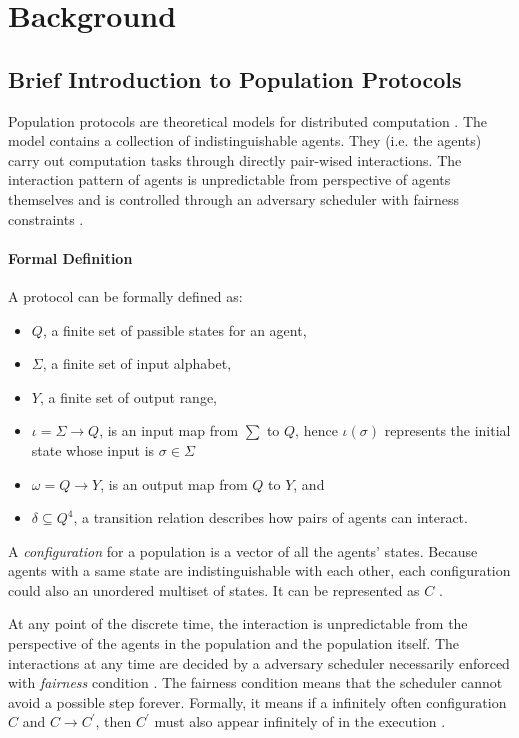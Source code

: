 \section{Background}

\subsection{Brief Introduction to Population Protocols \label{background} \cite{AspnesR2007, MCS11}}
\par\noindent
Population protocols are theoretical models for distributed computation \cite{AspnesR2007, MCS11}.
The model contains a collection of indistinguishable agents.
They (i.e. the agents) carry out computation tasks through directly pair-wised interactions.
The interaction pattern of agents is unpredictable from perspective of agents themselves
and is controlled through an adversary scheduler with fairness constraints \cite{AspnesR2007, MCS11}.
\paragraph{Formal Definition \cite{AspnesR2007}}
A protocol can be formally defined as:
\begin{itemize}
  \item $Q$, a finite set of passible states for an agent,
  \item $\Sigma$, a finite set of input alphabet,
  \item $Y$, a finite set of output range,
  \item $\iota = \Sigma \to Q $, is an input map from $\sum$ to $Q$, hence $\iota(\sigma)$ represents the initial state whose input is $\sigma \in \Sigma$
  \item $\omega = Q \to Y $, is an output map from $Q$ to $Y$, and
  \item $\delta \subseteq Q^{4}$, a transition relation describes how pairs of agents can interact.
\end{itemize}


\par\noindent
A \textit{configuration} for a population is a vector of all the agents' states.
Because agents with a same state are indistinguishable with each other, each configuration
could also an unordered multiset of states. It can be represented as $C$ \cite{AspnesR2007, MCS11}.


\par \label{IntroToPPFairScheduler} \noindent
At any point of the discrete time, the interaction is unpredictable from the perspective of the agents
in the population and the population itself. The interactions at any time are decided
by a adversary scheduler necessarily enforced with \textit{fairness} condition \cite{AspnesR2007, MCS11}.
The fairness condition means that the scheduler cannot avoid a possible step forever.
Formally, it means if a infinitely often configuration $C$ and $C \to C^{'}$,
then $C^{'}$ must also appear infinitely of in the execution \cite{AspnesR2007}.


